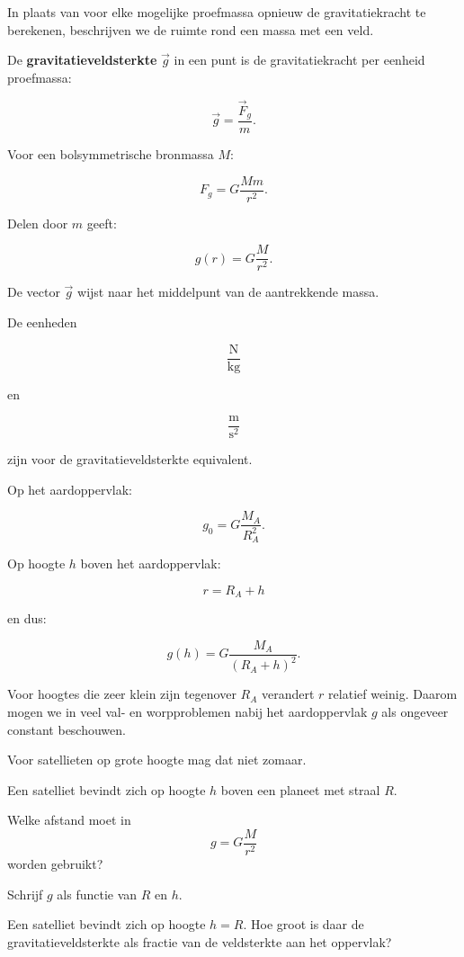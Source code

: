 \documentclass{ximera}
\begin{document}


In plaats van voor elke mogelijke proefmassa opnieuw de gravitatiekracht
te berekenen, beschrijven we de ruimte rond een massa met een veld.

\begin{definitie}
De \textbf{gravitatieveldsterkte} $\vec g$ in een punt is de
gravitatiekracht per eenheid proefmassa:

\[
\boxed{
\vec g=\frac{\vec F_g}{m}.
}
\]
\end{definitie}

Voor een bolsymmetrische bronmassa $M$:

\[
F_g=G\frac{Mm}{r^2}.
\]

Delen door $m$ geeft:

\[
\boxed{
g(r)=G\frac{M}{r^2}.
}
\]

De vector $\vec g$ wijst naar het middelpunt van de aantrekkende massa.

De eenheden

\[
\mathrm{\frac{N}{kg}}
\]

en

\[
\mathrm{\frac{m}{s^2}}
\]

zijn voor de gravitatieveldsterkte equivalent.



Op het aardoppervlak:

\[
g_0=G\frac{M_A}{R_A^2}.
\]

Op hoogte $h$ boven het aardoppervlak:

\[
r=R_A+h
\]

en dus:

\[
\boxed{
g(h)=G\frac{M_A}{(R_A+h)^2}.
}
\]

Voor hoogtes die zeer klein zijn tegenover $R_A$ verandert $r$ relatief
weinig. Daarom mogen we in veel val- en worpproblemen nabij het
aardoppervlak $g$ als ongeveer constant beschouwen.

Voor satellieten op grote hoogte mag dat niet zomaar.


\begin{oefening}{\oefB\ESS}

Een satelliet bevindt zich op hoogte $h$ boven een planeet met straal
$R$.

\begin{question}
Welke afstand moet in
\[
g=G\frac{M}{r^2}
\]
worden gebruikt?
\end{question}

\begin{question}
Schrijf $g$ als functie van $R$ en $h$.
\end{question}

\begin{question}
Een satelliet bevindt zich op hoogte $h=R$. Hoe groot is daar de
gravitatieveldsterkte als fractie van de veldsterkte aan het oppervlak?
\end{question}

\end{oefening}
\end{document}
